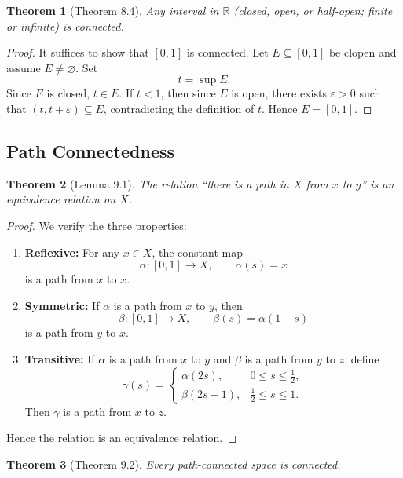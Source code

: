 \documentclass[12pt]{article}
\newtheorem{theorem}{Theorem}
\begin{document}
\begin{theorem}[Theorem 8.4]
Any interval in $\mathbb{R}$ (closed, open, or half-open; finite or infinite) is connected.
\end{theorem}

\begin{proof}
It suffices to show that $[0,1]$ is connected. Let $E \subseteq [0,1]$ be clopen and assume $E \neq \varnothing$. Set
\[
t = \sup E.
\]
Since $E$ is closed, $t \in E$. If $t < 1$, then since $E$ is open, there exists $\varepsilon > 0$ such that $(t, t+\varepsilon) \subseteq E$, contradicting the definition of $t$. Hence $E = [0,1]$.
\end{proof}

\subsection*{Path Connectedness}
\begin{theorem}[Lemma 9.1]
The relation ``there is a path in $X$ from $x$ to $y$'' is an equivalence relation on $X$.
\end{theorem}

\begin{proof}
We verify the three properties:

\begin{enumerate}
    \item[(i)] \textbf{Reflexive:} For any $x \in X$, the constant map
    \[
    \alpha : [0,1] \to X, \qquad \alpha(s)=x
    \]
    is a path from $x$ to $x$.

    \item[(ii)] \textbf{Symmetric:} If $\alpha$ is a path from $x$ to $y$, then
    \[
    \beta : [0,1] \to X, \qquad \beta(s)=\alpha(1-s)
    \]
    is a path from $y$ to $x$.

    \item[(iii)] \textbf{Transitive:} If $\alpha$ is a path from $x$ to $y$ and $\beta$ is a path from $y$ to $z$, define
    \[
    \gamma(s)=
    \begin{cases}
    \alpha(2s), & 0 \le s \le \tfrac12,\\[1mm]
    \beta(2s-1), & \tfrac12 \le s \le 1.
    \end{cases}
    \]
    Then $\gamma$ is a path from $x$ to $z$.
\end{enumerate}

Hence the relation is an equivalence relation.
\end{proof}

\begin{theorem}[Theorem 9.2]
Every path-connected space is connected.
\end{theorem}
\end{document}
